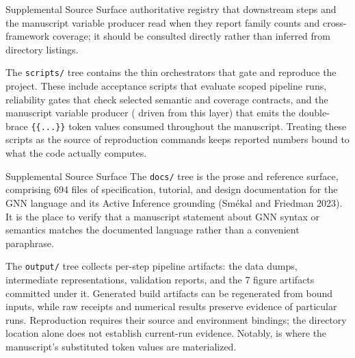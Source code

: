 \documentclass[
  ignorenonframetext,
]{beamer}
\begin{document}
\begin{frame}{Supplemental Source Surface}
authoritative registry that downstream steps and the manuscript variable
producer read when they report family counts and cross-framework
coverage; it should be consulted directly rather than inferred from
directory listings.

The \texttt{scripts/} tree contains the thin orchestrators that gate and
reproduce the project. These include acceptance scripts that evaluate
scoped pipeline runs, reliability gates that check selected semantic and
coverage contracts, and the manuscript variable producer
( driven from this layer) that
emits the double-brace \texttt{\{\{...\}\}} token values consumed
throughout the manuscript. Treating these scripts as the source of
reproduction commands keeps reported numbers bound to what the code
actually computes.

\end{frame}

\begin{frame}{Supplemental Source Surface}
The \texttt{docs/} tree is the prose and reference surface, comprising
694 files of specification, tutorial, and design documentation for the
GNN language and its Active Inference grounding (Smékal and Friedman
2023). It is the place to verify that a manuscript statement about GNN
syntax or semantics matches the documented language rather than a
convenient paraphrase.

The \texttt{output/} tree collects per-step pipeline artifacts: the data
dumps, intermediate representations, validation reports, and the 7
figure artifacts committed under it. Generated build artifacts can be
regenerated from bound inputs, while raw receipts and numerical results
preserve evidence of particular runs. Reproduction requires their source
and environment bindings; the directory location alone does not
establish current-run evidence. Notably,
 is where the
manuscript's substituted token values are materialized.
\end{frame}
\end{document}
